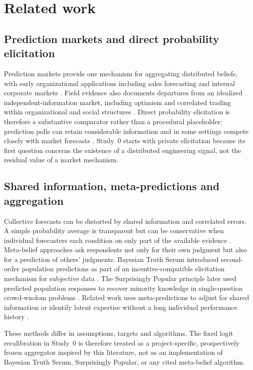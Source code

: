 \section{Related work}

\subsection{Prediction markets and direct probability elicitation}
Prediction markets provide one mechanism for aggregating distributed beliefs, with early organizational applications including sales forecasting and internal corporate markets \citep{chenplott2002,cowgill2009,cowgill2015}. Field evidence also documents departures from an idealized independent-information market, including optimism and correlated trading within organizational and social structures \citep{cowgill2009}. Direct probability elicitation is therefore a substantive comparator rather than a procedural placeholder: prediction polls can retain considerable information and in some settings compete closely with market forecasts \citep{atanasov2017,dana2019}. Study~0 starts with private elicitation because its first question concerns the existence of a distributed engineering signal, not the residual value of a market mechanism.

\subsection{Shared information, meta-predictions and aggregation}
Collective forecasts can be distorted by shared information and correlated errors. A simple probability average is transparent but can be conservative when individual forecasters each condition on only part of the available evidence \citep{baron2014,satopaa2014}. Meta-belief approaches ask respondents not only for their own judgment but also for a prediction of others' judgments. Bayesian Truth Serum introduced second-order population predictions as part of an incentive-compatible elicitation mechanism for subjective data \citep{prelec2004}. The Surprisingly Popular principle later used predicted population responses to recover minority knowledge in single-question crowd-wisdom problems \citep{prelec2017}. Related work uses meta-predictions to adjust for shared information or identify latent expertise without a long individual performance history \citep{palley2019,martinie2020,wilkening2022,peker2025}.

These methods differ in assumptions, targets and algorithms. The fixed logit recalibration in Study~0 is therefore treated as a project-specific, prospectively frozen aggregator inspired by this literature, not as an implementation of Bayesian Truth Serum, Surprisingly Popular, or any cited meta-belief algorithm.

